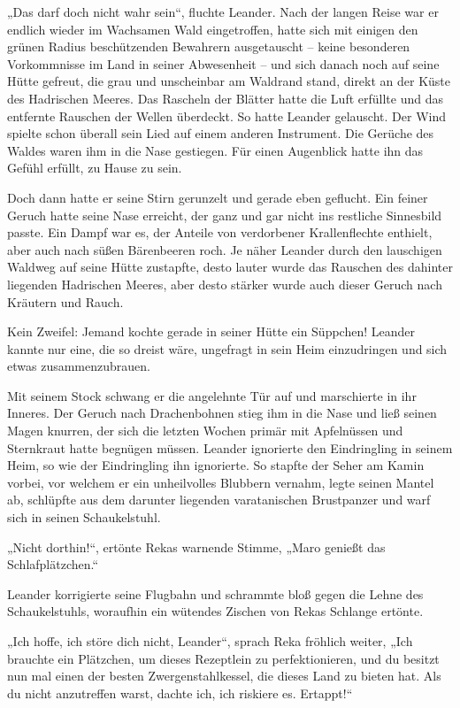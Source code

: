 \documentclass[10pt, a4paper, oneside]{book}
\begin{document}
„Das darf doch nicht wahr sein“, fluchte Leander. Nach der langen Reise war er endlich wieder im Wachsamen Wald eingetroffen, hatte sich mit einigen den grünen Radius beschützenden Bewahrern ausgetauscht – keine besonderen Vorkommnisse im Land in seiner Abwesenheit – und sich danach noch auf seine Hütte gefreut, die grau und unscheinbar am Waldrand stand, direkt an der Küste des Hadrischen Meeres. Das Rascheln der Blätter hatte die Luft erfüllte und das entfernte Rauschen der Wellen überdeckt. So hatte Leander gelauscht. Der Wind spielte schon überall sein Lied auf einem anderen Instrument. Die Gerüche des Waldes waren ihm in die Nase gestiegen. Für einen Augenblick hatte ihn das Gefühl erfüllt, zu Hause zu sein.

Doch dann hatte er seine Stirn gerunzelt und gerade eben geflucht. Ein feiner Geruch hatte seine Nase erreicht, der ganz und gar nicht ins restliche Sinnesbild passte. Ein Dampf war es, der Anteile von verdorbener Krallenflechte enthielt, aber auch nach süßen Bärenbeeren roch. Je näher Leander durch den lauschigen Waldweg auf seine Hütte zustapfte, desto lauter wurde das Rauschen des dahinter liegenden Hadrischen Meeres, aber desto stärker wurde auch dieser Geruch nach Kräutern und Rauch.

Kein Zweifel: Jemand kochte gerade in seiner Hütte ein Süppchen! Leander kannte nur eine, die so dreist wäre, ungefragt in sein Heim einzudringen und sich etwas zusammenzubrauen.

Mit seinem Stock schwang er die angelehnte Tür auf und marschierte in ihr Inneres. Der Geruch nach Drachenbohnen stieg ihm in die Nase und ließ seinen Magen knurren, der sich die letzten Wochen primär mit Apfelnüssen und Sternkraut hatte begnügen müssen. Leander ignorierte den Eindringling in seinem Heim, so wie der Eindringling ihn ignorierte. So stapfte der Seher am Kamin vorbei, vor welchem er ein unheilvolles Blubbern vernahm, legte seinen Mantel ab, schlüpfte aus dem darunter liegenden varatanischen Brustpanzer und warf sich in seinen Schaukelstuhl.

„Nicht dorthin!“, ertönte Rekas warnende Stimme, „Maro genießt das Schlafplätzchen.“

Leander korrigierte seine Flugbahn und schrammte bloß gegen die Lehne des Schaukelstuhls, woraufhin ein wütendes Zischen von Rekas Schlange ertönte.

„Ich hoffe, ich störe dich nicht, Leander“, sprach Reka fröhlich weiter, „Ich brauchte ein Plätzchen, um dieses Rezeptlein zu perfektionieren, und du besitzt nun mal einen der besten Zwergenstahlkessel, die dieses Land zu bieten hat. Als du nicht anzutreffen warst, dachte ich, ich riskiere es. Ertappt!“
\end{document}
